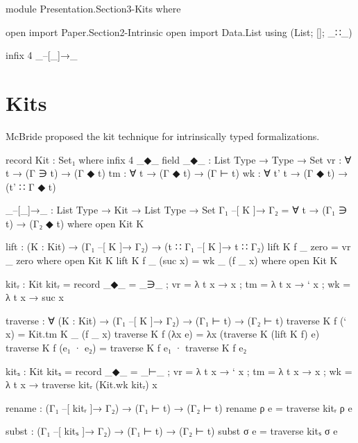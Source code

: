 \begin{code}[hide]
module Presentation.Section3-Kits where

open import Paper.Section2-Intrinsic
open import Data.List using (List; []; _∷_)

infix  4  _–[_]→_
\end{code}

\newpage
\section{Kits}

McBride proposed the kit technique for intrinsically typed formalizations.

\begin{code}
record Kit : Set₁ where
  infix 4 _◆_
  field
    _◆_  : List Type → Type → Set
    vr   : ∀ t → (Γ ∋ t) → (Γ ◆ t)
    tm   : ∀ t → (Γ ◆ t) → (Γ ⊢ t)
    wk   : ∀ {t'} t → (Γ ◆ t) → (t' ∷ Γ ◆ t)

_–[_]→_ : List Type → Kit → List Type → Set
Γ₁ –[ K ]→ Γ₂ = ∀ t → (Γ₁ ∋ t) → (Γ₂ ◆ t) where open Kit K

lift : (K : Kit) → (Γ₁ –[ K ]→ Γ₂) → (t ∷ Γ₁ –[ K ]→ t ∷ Γ₂)
lift K f _ zero     = vr _ zero     where open Kit K
lift K f _ (suc x)  = wk _ (f _ x)  where open Kit K

kitᵣ : Kit
kitᵣ = record {  _◆_  =  _∋_
              ;  vr   = λ t x → x
              ;  tm   = λ t x → ` x
              ;  wk   = λ t x → suc x
              }

traverse : ∀ (K : Kit) → (Γ₁ –[ K ]→ Γ₂) → (Γ₁ ⊢ t) → (Γ₂ ⊢ t)
traverse K f (` x)      = Kit.tm K _ (f _ x)
traverse K f (λx e)     = λx (traverse K (lift K f) e)
traverse K f (e₁ · e₂)  = traverse K f e₁ · traverse K f e₂

kitₛ : Kit
kitₛ = record {  _◆_  = _⊢_
              ;  vr   = λ t x → ` x
              ;  tm   = λ t x → x
              ;  wk   = λ t x → traverse kitᵣ (Kit.wk kitᵣ) x
              }

rename : (Γ₁ –[ kitᵣ ]→ Γ₂) → (Γ₁ ⊢ t) → (Γ₂ ⊢ t)
rename ρ e = traverse kitᵣ ρ e

subst : (Γ₁ –[ kitₛ ]→ Γ₂) → (Γ₁ ⊢ t) → (Γ₂ ⊢ t)
subst σ e = traverse kitₛ σ e
\end{code}
